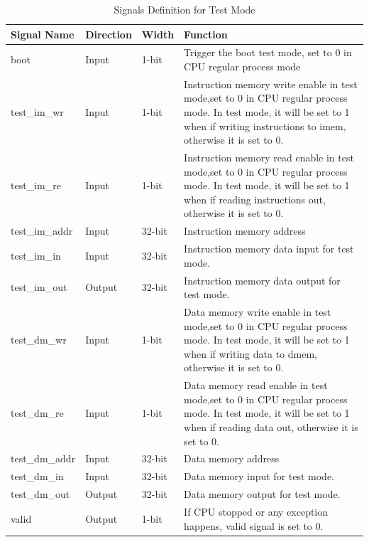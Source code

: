 \documentclass[a4paper]{article}
\begin{document}
\begin{table}[htp]
\caption{Signals Definition for Test Mode}\label{tab:signaldef}
\begin{center}
	\begin{tabular}{|l|l|l|p{6cm}|}
	\hline
	\textbf{Signal Name} & \textbf{Direction} & \textbf{Width} & \textbf{Function}\\ \hline \hline
	boot			& Input 	& 1-bit	& Trigger the boot test mode, 
									  set to 0 in CPU regular process mode\\ \hline
	test\_im\_wr 	& Input	& 1-bit	& Instruction memory write enable in test mode,set to 0 in 	
								  CPU regular process mode. In test mode, it will be set to 1 when if writing instructions to imem, otherwise it is set to 0.\\ \hline
	test\_im\_re 	& Input & 1-bit & Instruction memory read enable in test mode,set to 0 in 	
								  CPU regular process mode. In test mode, it will be set to 1 when if reading instructions out, otherwise it is set to 0. \\ \hline
	test\_im\_addr 	& Input & 32-bit& Instruction memory address\\ \hline
	test\_im\_in 	& Input & 32-bit& Instruction memory data input for test mode. \\ \hline
	test\_im\_out 	& Output& 32-bit& Instruction memory data output for test mode. \\ \hline
	test\_dm\_wr 	& Input	& 1-bit	& Data memory write enable in test mode,set to 0 in 	
								  CPU regular process mode. In test mode, it will be set to 1 when if writing data to dmem, otherwise it is set to 0.\\ \hline
	test\_dm\_re 	& Input & 1-bit & Data memory read enable in test mode,set to 0 in 	
								  CPU regular process mode. In test mode, it will be set to 1 when if reading data out, otherwise it is set to 0.\\ \hline
	test\_dm\_addr 	& Input & 32-bit& Data memory address\\ \hline
	test\_dm\_in 	& Input & 32-bit& Data memory input for test mode. \\ \hline
	test\_dm\_out 	& Output& 32-bit& Data memory output for test mode. \\ \hline
	valid			& Output& 1-bit & If CPU stopped or any exception happens, valid signal is set to 0.\\ 
	\hline
	\end{tabular}
\end{center}
\end{table}
\end{document}
